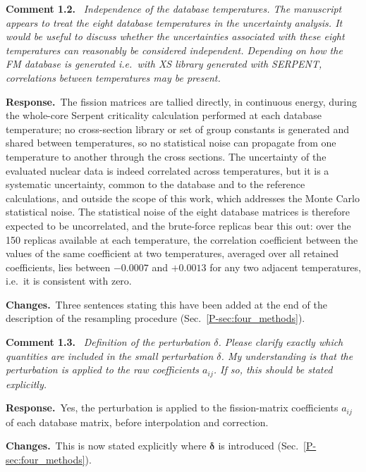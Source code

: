 \documentclass[11pt]{article}
\newenvironment{revcomment}[1]
  {\par\medskip\noindent\textbf{Comment #1.}\ \itshape}
  {\par}
\newcommand{\response}{\par\noindent\textbf{Response.}\ }
\newcommand{\changes}{\par\noindent\textbf{Changes.}\ }
\begin{document}
\begin{revcomment}{1.2}
Independence of the database temperatures. The manuscript appears to treat the eight
database temperatures in the uncertainty analysis. It would be useful to discuss whether
the uncertainties associated with these eight temperatures can reasonably be considered
independent. Depending on how the FM database is generated i.e.\ with XS library
generated with SERPENT, correlations between temperatures may be present.
\end{revcomment}
\response The fission matrices are tallied directly, in continuous energy, during the whole-core Serpent criticality calculation performed at each database temperature; no cross-section library or set of group constants is generated and shared between temperatures, so no statistical noise can propagate from one temperature to another through the cross sections. The uncertainty of the evaluated nuclear data is indeed correlated across temperatures, but it is a systematic uncertainty, common to the database and to the reference calculations, and outside the scope of this work, which addresses the Monte Carlo statistical noise.
The statistical noise of the eight database matrices is therefore expected to be uncorrelated, and the brute-force replicas bear this out: over the 150 replicas available at each temperature, the correlation coefficient between the values of the same coefficient at two temperatures, averaged over all retained coefficients, lies between $-0.0007$ and $+0.0013$ for any two adjacent temperatures, i.e.\ it is consistent with zero.
\changes Three sentences stating this have been added at the end of the description of the resampling procedure (Sec.~\ref{P-sec:four_methods}).

\begin{revcomment}{1.3}
Definition of the perturbation $\delta$. Please clarify exactly which quantities are
included in the small perturbation $\delta$. My understanding is that the perturbation
is applied to the raw coefficients $a_{ij}$. If so, this should be stated explicitly.
\end{revcomment}
\response Yes, the perturbation is applied to the fission-matrix coefficients $a_{ij}$ of each database matrix, before interpolation and correction.
\changes This is now stated explicitly where $\boldsymbol\delta$ is introduced (Sec.~\ref{P-sec:four_methods}).
\end{document}
